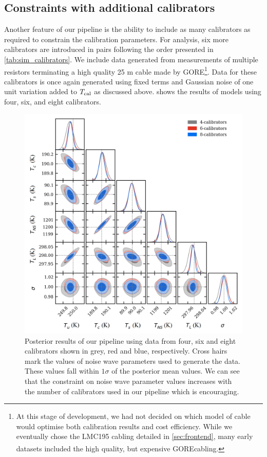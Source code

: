 \subsection{Constraints with additional calibrators}\label{sec:multCal}
Another feature of our pipeline is the ability to include as many calibrators as required to constrain the calibration parameters. For analysis, six more calibrators are introduced in pairs following the order presented in \cref{tab:sim_calibrators}. We include data generated from measurements of multiple resistors terminating a high quality 25 m cable made by GORE\textsuperscript \textregistered\footnote{At this stage of development, we had not decided on which model of cable would optimise both calibration results and cost efficiency. While we eventually chose the LMC195 cabling detailed in \cref{sec:frontend}, many early datasets included the high quality, but expensive GORE\textsuperscript \textregistered cabling.}.  Data for these calibrators is once again generated using fixed terms and Gaussian noise of one unit variation added to $T_{\mathrm{cal}}$ as discussed above.  shows the results of models using four, six, and eight calibrators.

\begin{figure}
  \centering
  \includegraphics[width=\columnwidth]{linearall}
  \caption{Posterior results of our pipeline using data from four, six and eight calibrators shown in grey, red and blue, respectively. Cross hairs mark the values of noise wave parameters used to generate the data. These values fall within $1\sigma$ of the posterior mean values. We can see that the constraint on noise wave parameter values increases with the number of calibrators used in our pipeline which is encouraging. \label{fig:linearall}}
\end{figure}

